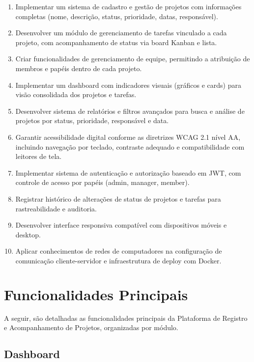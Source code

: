 \documentclass[a4paper,12pt,oneside]{article}
\begin{document}
\begin{enumerate}[leftmargin=2cm]
  \item Implementar um sistema de cadastro e gestão de projetos com informações completas (nome, descrição, status, prioridade, datas, responsável).
  \item Desenvolver um módulo de gerenciamento de tarefas vinculado a cada projeto, com acompanhamento de status via board Kanban e lista.
  \item Criar funcionalidades de gerenciamento de equipe, permitindo a atribuição de membros e papéis dentro de cada projeto.
  \item Implementar um dashboard com indicadores visuais (gráficos e cards) para visão consolidada dos projetos e tarefas.
  \item Desenvolver sistema de relatórios e filtros avançados para busca e análise de projetos por status, prioridade, responsável e data.
  \item Garantir acessibilidade digital conforme as diretrizes WCAG 2.1 nível AA, incluindo navegação por teclado, contraste adequado e compatibilidade com leitores de tela.
  \item Implementar sistema de autenticação e autorização baseado em JWT, com controle de acesso por papéis (admin, manager, member).
  \item Registrar histórico de alterações de status de projetos e tarefas para rastreabilidade e auditoria.
  \item Desenvolver interface responsiva compatível com dispositivos móveis e desktop.
  \item Aplicar conhecimentos de redes de computadores na configuração de comunicação cliente-servidor e infraestrutura de deploy com Docker.
\end{enumerate}

\section{Funcionalidades Principais}

A seguir, são detalhadas as funcionalidades principais da Plataforma de Registro e Acompanhamento de Projetos, organizadas por módulo.

\subsection{Dashboard}
\end{document}
